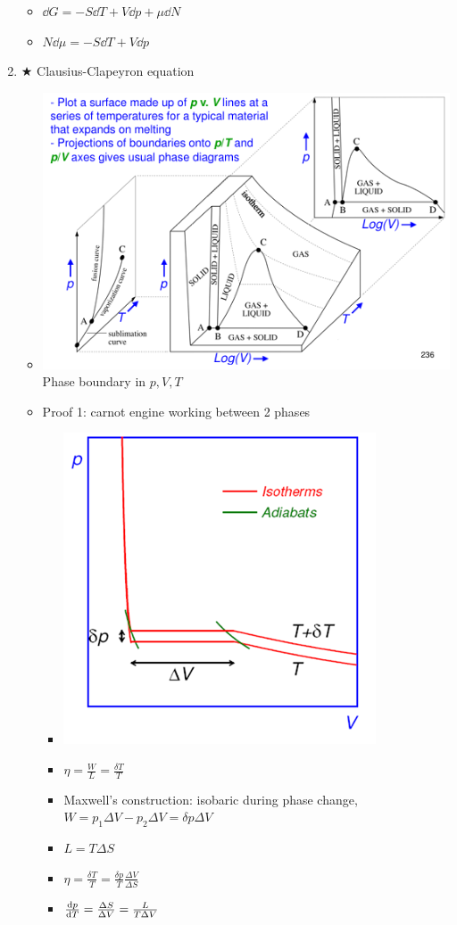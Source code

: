 \documentclass{article}
\theoremstyle{remark}
\newcommand{\myref}[1]{\hyperref[back:#1]{$\bigstar$}\label{#1}}
\begin{document}
\begin{enumerate}
\begin{itemize}
            \item $\dd G=-S\dd T+V\dd p+\mu\dd N$
            \item $N\dd\mu=-S\dd T+V\dd p$
        \end{itemize}
    \item \myref{cc_equ} Clausius-Clapeyron equation\begin{itemize}
            \item \includegraphics*[width=0.5\linewidth]{pVT_phase_boundary.png}\newline
                    Phase boundary in $p,V,T$
            \item Proof 1: carnot engine working between 2 phases\begin{itemize}
                \item \includegraphics*[width=0.5\linewidth]{cc_equ_carnot_cycle.png}
                \item $\eta=\frac{W}{L}=\frac{\delta T}{T}$
                \item Maxwell's construction: isobaric during phase change, $W=p_1\Delta V-p_2\Delta V=\delta p\Delta V$
                \item $L=T\Delta S$
                \item $\eta=\frac{\delta T}{T}=\frac{\delta p}{T}\frac{\Delta V}{\Delta S}$
                \item $\dv{p}{T}=\frac{\Delta S}{\Delta V}=\frac{L}{T\Delta V}$
            \end{itemize}

\end{itemize}
\end{enumerate}
\end{document}
